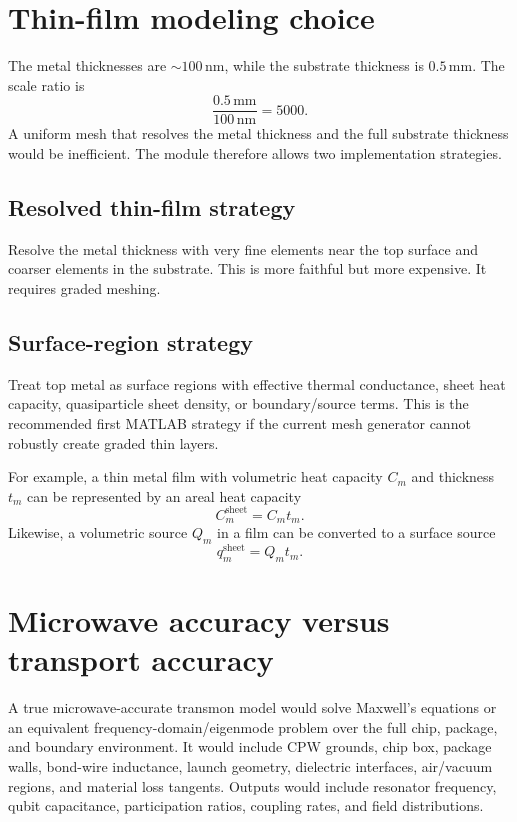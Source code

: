 \documentclass[11pt]{article}
\begin{document}
\section{Thin-film modeling choice}
The metal thicknesses are $\sim100\,\mathrm{nm}$, while the substrate thickness is $0.5\,\mathrm{mm}$. The scale ratio is
\begin{equation}
    \frac{0.5\,\mathrm{mm}}{100\,\mathrm{nm}} = 5000.
\end{equation}
A uniform mesh that resolves the metal thickness and the full substrate thickness would be inefficient. The module therefore allows two implementation strategies.

\subsection{Resolved thin-film strategy}
Resolve the metal thickness with very fine elements near the top surface and coarser elements in the substrate. This is more faithful but more expensive. It requires graded meshing.

\subsection{Surface-region strategy}
Treat top metal as surface regions with effective thermal conductance, sheet heat capacity, quasiparticle sheet density, or boundary/source terms. This is the recommended first MATLAB strategy if the current mesh generator cannot robustly create graded thin layers.

For example, a thin metal film with volumetric heat capacity $C_m$ and thickness $t_m$ can be represented by an areal heat capacity
\begin{equation}
    C_m^{\mathrm{sheet}} = C_m t_m.
\end{equation}
Likewise, a volumetric source $Q_m$ in a film can be converted to a surface source
\begin{equation}
    q_m^{\mathrm{sheet}} = Q_m t_m.
\end{equation}

\section{Microwave accuracy versus transport accuracy}
A true microwave-accurate transmon model would solve Maxwell's equations or an equivalent frequency-domain/eigenmode problem over the full chip, package, and boundary environment. It would include CPW grounds, chip box, package walls, bond-wire inductance, launch geometry, dielectric interfaces, air/vacuum regions, and material loss tangents. Outputs would include resonator frequency, qubit capacitance, participation ratios, coupling rates, and field distributions.
\end{document}

